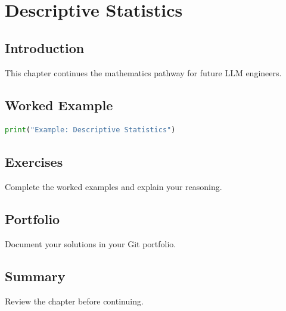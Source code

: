 \chapter{Descriptive Statistics}
\label{chap:vol4-26}



\section{Introduction}
This chapter continues the mathematics pathway for future LLM engineers.

\section{Worked Example}
\begin{lstlisting}[language=Python]
print("Example: Descriptive Statistics")
\end{lstlisting}

\section{Exercises}
\begin{exercise}
Complete the worked examples and explain your reasoning.
\end{exercise}

\section{Portfolio}
Document your solutions in your Git portfolio.

\section{Summary}
Review the chapter before continuing.
